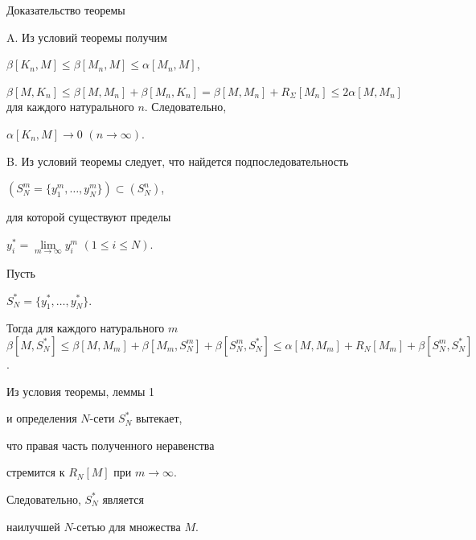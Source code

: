 \begin{pf*}{Доказательство теоремы}


A. Из условий теоремы получим


$\beta [K_{n},M] \leq \beta [M_{n},M] \leq \alpha [M_{n},M]$, 


$\beta [M,K_{n}] \leq \beta [M,M_{n}] + \beta [M_{n},K_{n}] =


\beta [M,M_{n}] + R_{\Sigma }[M_{n}]


\leq 2\alpha [M,M_{n}]$ для каждого натурального $n$. Следовательно,


$\alpha [K_{n},M] \rightarrow 0$ $(n \rightarrow \infty)$. 





B. Из условий теоремы следует, что найдется подпоследовательность 


$(S_{N}^{m}= \{y_{1}^{m},\dotsc, y_{N}^{m}\}) \subset (S_{N}^{n})$,


для которой существуют пределы


$y_{i}^{*} = \lim \limits_{m \to \infty}{y_{i}^{m}}$ $(1 \leq i \leq N)$.


Пусть 


$S_{N}^{*}= \{y_{1}^{*},\dotsc, y_{N}^{*}\}$.


Тогда для каждого натурального $m$ \ $\beta [M,S_{N}^{*}] \leq


\beta [M,M_{m}] + \beta [M_{m},S_{N}^{m}] + \beta [S_{N}^{m},S_{N}^{*}]


\leq \alpha [M,M_{m}] + R_{N}[M_{m}] + \beta [S_{N}^{m},S_{N}^{*}]$. 


Из условия теоремы, леммы 1


и определения $N$-сети $S_{N}^{*}$ вытекает, 


что правая часть полученного неравенства


стремится к $R_{N}[M]$ при $m \to \infty$.


Следовательно, $S_{N}^{*}$ является


наилучшей $N$-сетью для множества $M$.


\end{pf*}





